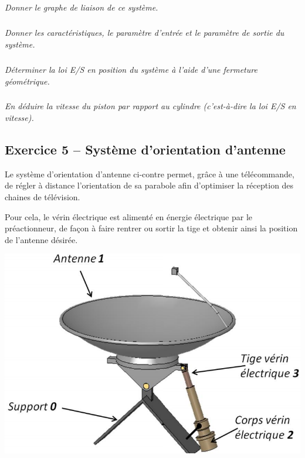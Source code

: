 \documentclass[10pt,fleqn]{article} %
\begin{document}
\begin{multicols}{2}
\subparagraph{}
\textit{Donner le graphe de liaison de ce système.}

\ifprof
\begin{corrige}
\end{corrige}
\else \fi

\subparagraph{}
\textit{Donner les caractéristiques, le paramètre d’entrée et le paramètre de sortie du système. }

\ifprof
\begin{corrige}
\end{corrige}
\else \fi


\subparagraph{}
\textit{Déterminer la loi E/S en position du système à l’aide d’une fermeture géométrique. }

\ifprof
\begin{corrige}
\end{corrige}
\else \fi


\subparagraph{}
\textit{En déduire la vitesse du piston par rapport au cylindre (c'est-à-dire la loi E/S en vitesse). }

\ifprof
\begin{corrige}
\end{corrige}
\else \fi

\newpage

\subsection*{Exercice 5 -- Système d'orientation d'antenne}
\setcounter{exo}{0}


Le système d’orientation d’antenne ci-contre permet, grâce à une télécommande, de régler à distance l’orientation de sa parabole afin d’optimiser la réception des chaines de télévision. 
 
Pour cela, le vérin électrique est alimenté en énergie électrique par le préactionneur, de façon à faire rentrer ou sortir la tige et obtenir ainsi la position de l’antenne désirée. 
\begin{center}
\includegraphics[width=.8\linewidth]{images/fig3} 
\end{center}



\end{multicols}
\end{document}
